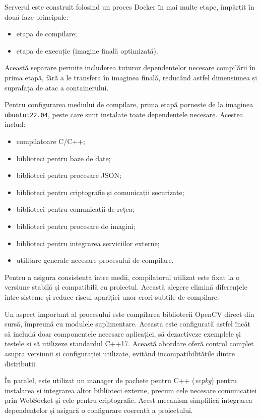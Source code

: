 Serverul este construit folosind un proces Docker în mai multe etape, împărțit în două faze principale:
\begin{itemize}
    \item etapa de compilare;
    \item etapa de execuție (imagine finală optimizată).
\end{itemize}

Această separare permite includerea tuturor dependențelor necesare compilării în prima etapă, fără a le transfera în imaginea finală, reducând astfel dimensiunea și suprafața de atac a containerului.

Pentru configurarea mediului de compilare, prima etapă pornește de la imaginea \texttt{ubuntu:22.04}, peste care sunt instalate toate dependențele necesare. Acestea includ:
\begin{itemize}
    \item compilatoare C/C++;
    \item biblioteci pentru baze de date;
    \item biblioteci pentru procesare JSON;
    \item biblioteci pentru criptografie și comunicații securizate;
    \item biblioteci pentru comunicații de rețea;
    \item biblioteci pentru procesare de imagini;
    \item biblioteci pentru integrarea serviciilor externe;
    \item utilitare generale necesare procesului de compilare.
\end{itemize}

Pentru a asigura consistența între medii, compilatorul utilizat este fixat la o versiune stabilă și compatibilă cu proiectul. Această alegere elimină diferențele între sisteme și reduce riscul apariției unor erori subtile de compilare.

Un aspect important al procesului este compilarea bibliotecii OpenCV direct din sursă, împreună cu modulele suplimentare. Aceasta este configurată astfel încât să includă doar componentele necesare aplicației, să dezactiveze exemplele și testele și să utilizeze standardul C++17. Această abordare oferă control complet asupra versiunii și configurației utilizate, evitând incompatibilitățile dintre distribuții.

În paralel, este utilizat un manager de pachete pentru C++ (\textit{vcpkg}) pentru instalarea și integrarea altor biblioteci externe, precum cele necesare comunicației prin WebSocket și cele pentru criptografie. Acest mecanism simplifică integrarea dependențelor și asigură o configurare coerentă a proiectului.

